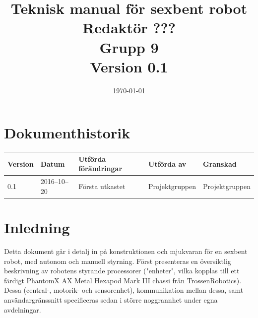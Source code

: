 \documentclass[a4paper,titlepage,12pt]{article}
\begin{document}
\listoftodos
	\title{\LARGE
		\textbf{Teknisk manual för sexbent robot} \\
		\vspace*{0.5\baselineskip}
		\large
		Redaktör ??? \\
		Grupp 9 \\
		\small
		\vspace*{0.5\baselineskip}
		Version 0.1}

	\date{\today}

	\maketitle
	
	\newpage

	\tableofcontents
	\newpage



	\section*{Dokumenthistorik}
	\renewcommand*{\arraystretch}{1.4}
    \begin{longtable}[c]{ l l >{\raggedright}p{5cm} >{\raggedright}p{3cm} l }
		\textbf{Version} & \textbf{Datum} & \textbf{Utförda förändringar} 
		& \textbf{Utförda av} & \textbf{Granskad} \\ \midrule
		
		0.1 & 2016--10--20 & Första utkastet & Projektgruppen &
        Projektgruppen \\
            
	\end{longtable}


	\newpage

	\raggedright

	\section{Inledning}
	Detta dokument går i detalj in på konstruktionen och mjukvaran för en 
	sexbent robot, med autonom och manuell styrning. Först presenteras en 
	översiktlig beskrivning av robotens styrande processorer ("enheter", vilka kopplas till ett färdigt 
	PhantomX AX Metal Hexapod Mark III chassi från TrossenRobotics). Dessa (central-, 
	motorik- och sensorenhet), kommunikation mellan dessa, samt användargränssnitt specificeras 
	sedan i större noggrannhet under egna avdelningar.
\end{document}
